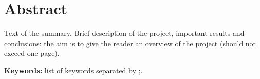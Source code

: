 \chapter*{Abstract}\label{ch:abstract}

Text of the summary.
Brief description of the project, important results and conclusions: the aim is to give the reader an overview of the project (should not exceed one page).

\textbf{Keywords:} list of keywords separated by ;.
